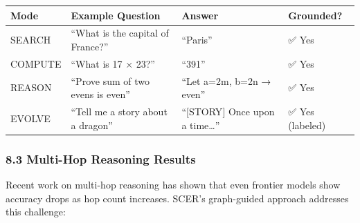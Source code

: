 \documentclass[
  11pt,
  a4paper,
]{article}
\begin{document}
\begin{longtable}[]{@{}
  >{\raggedright\arraybackslash}p{}
  >{\raggedright\arraybackslash}p{}
  >{\raggedright\arraybackslash}p{}
  >{\raggedright\arraybackslash}p{}@{}}
\toprule\noalign{}
\begin{minipage}[b]{\linewidth}\raggedright
Mode
\end{minipage} & \begin{minipage}[b]{\linewidth}\raggedright
Example Question
\end{minipage} & \begin{minipage}[b]{\linewidth}\raggedright
Answer
\end{minipage} & \begin{minipage}[b]{\linewidth}\raggedright
Grounded?
\end{minipage} \\
\midrule\noalign{}
\endhead
\bottomrule\noalign{}
\endlastfoot
SEARCH & ``What is the capital of France?'' & ``Paris'' & ✅ Yes \\
COMPUTE & ``What is 17 × 23?'' & ``391'' & ✅ Yes \\
REASON & ``Prove sum of two evens is even'' & ``Let a=2m, b=2n → even''
& ✅ Yes \\
EVOLVE & ``Tell me a story about a dragon'' & ``{[}STORY{]} Once upon a
time\ldots{}'' & ✅ Yes (labeled) \\
\end{longtable}

\subsubsection{8.3 Multi-Hop Reasoning
Results}\label{multi-hop-reasoning-results}

Recent work on multi-hop reasoning has shown that even frontier models
show accuracy drops as hop count increases. SCER's graph-guided approach
addresses this challenge:
\end{document}
